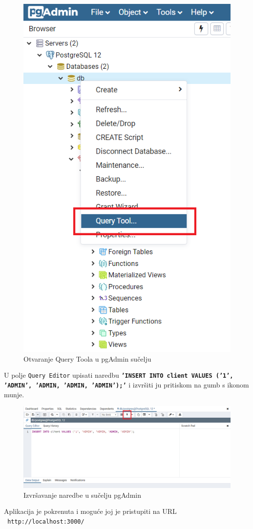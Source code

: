 			\begin{figure}[h]
				\centering
				\includegraphics[scale=0.5]{slike/pustanjeupogon/query.png}
				\caption{Otvaranje Query Toola u pgAdmin sučelju}
				
			\end{figure}
			\newpage
			 U polje \texttt{\small Query Editor} upisati naredbu \texttt{\textbf{'INSERT INTO client VALUES ('1', 'ADMIN', 'ADMIN, 'ADMIN, 'ADMIN');'}} i izvršiti ju pritiskom na gumb s ikonom munje.
			
			\begin{figure}[h]
				\centering
				\includegraphics[scale=0.5]{slike/pustanjeupogon/insert.png}
				\caption{Izvršavanje naredbe u sučelju pgAdmin}
			\end{figure}
			
			Aplikacija je pokrenuta i moguće joj je pristupiti na URL
			\\
			\texttt{ \small http://localhost:3000/}
			
			
			\eject 